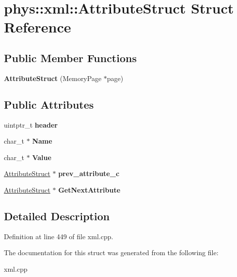 \hypertarget{structphys_1_1xml_1_1AttributeStruct}{
\section{phys::xml::AttributeStruct Struct Reference}
\label{dd/dfe/structphys_1_1xml_1_1AttributeStruct}
}
\subsection*{Public Member Functions}
\begin{DoxyCompactItemize}
\item 
\hypertarget{structphys_1_1xml_1_1AttributeStruct_ae56b37b04de2de9b06f2ab62063860d0}{
{\bfseries AttributeStruct} (MemoryPage $\ast$page)}
\label{dd/dfe/structphys_1_1xml_1_1AttributeStruct_ae56b37b04de2de9b06f2ab62063860d0}

\end{DoxyCompactItemize}
\subsection*{Public Attributes}
\begin{DoxyCompactItemize}
\item 
\hypertarget{structphys_1_1xml_1_1AttributeStruct_a9fd6577532fd75614cbbeef25ebc483d}{
uintptr\_\-t {\bfseries header}}
\label{dd/dfe/structphys_1_1xml_1_1AttributeStruct_a9fd6577532fd75614cbbeef25ebc483d}

\item 
\hypertarget{structphys_1_1xml_1_1AttributeStruct_af33547ea3e8c21d16737fc7ebcb94c95}{
char\_\-t $\ast$ {\bfseries Name}}
\label{dd/dfe/structphys_1_1xml_1_1AttributeStruct_af33547ea3e8c21d16737fc7ebcb94c95}

\item 
\hypertarget{structphys_1_1xml_1_1AttributeStruct_a2a7018296eb97ef342b5230d59f6e6ee}{
char\_\-t $\ast$ {\bfseries Value}}
\label{dd/dfe/structphys_1_1xml_1_1AttributeStruct_a2a7018296eb97ef342b5230d59f6e6ee}

\item 
\hypertarget{structphys_1_1xml_1_1AttributeStruct_ad37be3bf8c8d5a469396e882af402f89}{
\hyperlink{structphys_1_1xml_1_1AttributeStruct}{AttributeStruct} $\ast$ {\bfseries prev\_\-attribute\_\-c}}
\label{dd/dfe/structphys_1_1xml_1_1AttributeStruct_ad37be3bf8c8d5a469396e882af402f89}

\item 
\hypertarget{structphys_1_1xml_1_1AttributeStruct_acbd550c08cec46228d1820957a153672}{
\hyperlink{structphys_1_1xml_1_1AttributeStruct}{AttributeStruct} $\ast$ {\bfseries GetNextAttribute}}
\label{dd/dfe/structphys_1_1xml_1_1AttributeStruct_acbd550c08cec46228d1820957a153672}

\end{DoxyCompactItemize}


\subsection{Detailed Description}


Definition at line 449 of file xml.cpp.



The documentation for this struct was generated from the following file:\begin{DoxyCompactItemize}
\item 
xml.cpp\end{DoxyCompactItemize}
